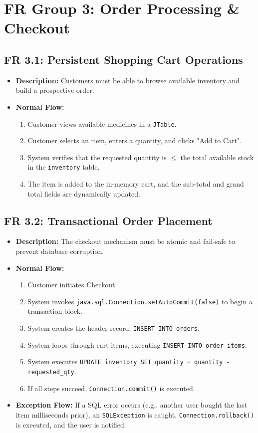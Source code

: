\documentclass[12pt,a4paper]{report}
\begin{document}
\section{FR Group 3: Order Processing \& Checkout}

\subsection{FR 3.1: Persistent Shopping Cart Operations}
\begin{itemize}
    \item \textbf{Description:} Customers must be able to browse available inventory and build a prospective order.
    \item \textbf{Normal Flow:}
        \begin{enumerate}
            \item Customer views available medicines in a \texttt{JTable}.
            \item Customer selects an item, enters a quantity, and clicks "Add to Cart".
            \item System verifies that the requested quantity is $\leq$ the total available stock in the \texttt{inventory} table.
            \item The item is added to the in-memory cart, and the sub-total and grand total fields are dynamically updated.
        \end{enumerate}
\end{itemize}

\subsection{FR 3.2: Transactional Order Placement}
\begin{itemize}
    \item \textbf{Description:} The checkout mechanism must be atomic and fail-safe to prevent database corruption.
    \item \textbf{Normal Flow:}
        \begin{enumerate}
            \item Customer initiates Checkout.
            \item System invokes \texttt{java.sql.Connection.setAutoCommit(false)} to begin a transaction block.
            \item System creates the header record: \texttt{INSERT INTO orders}.
            \item System loops through cart items, executing \texttt{INSERT INTO order\_items}.
            \item System executes \texttt{UPDATE inventory SET quantity = quantity - requested\_qty}.
            \item If all steps succeed, \texttt{Connection.commit()} is executed.
        \end{enumerate}
    \item \textbf{Exception Flow:} If a SQL error occurs (e.g., another user bought the last item milliseconds prior), an \texttt{SQLException} is caught, \texttt{Connection.rollback()} is executed, and the user is notified.
\end{itemize}
\end{document}
